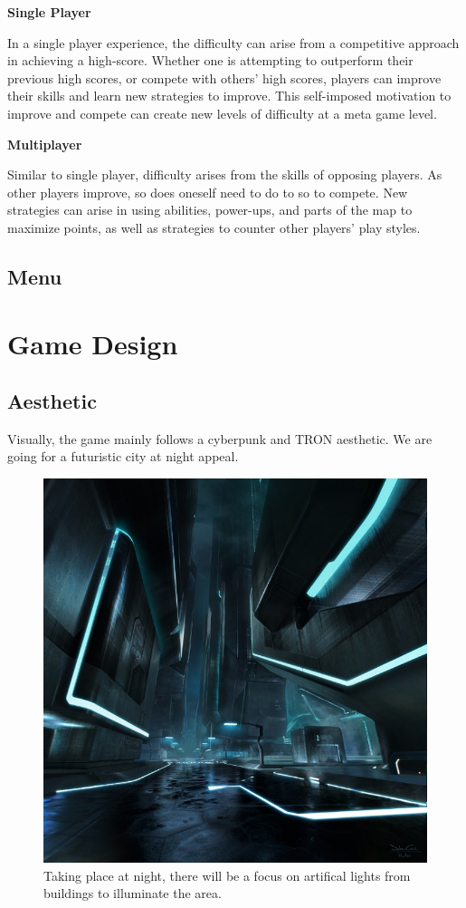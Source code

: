 \documentclass{article}
\theoremstyle{definition}
\begin{document}
\textbf{Single Player}

In a single player experience, the difficulty can arise
from a competitive approach in achieving a high-score. Whether one is
attempting to outperform their previous high scores, or compete with others'
high scores, players can improve their skills and learn new strategies to
improve. This self-imposed motivation to improve and compete can create new
levels of difficulty at a meta game level.

\textbf{Multiplayer}

Similar to single player, difficulty arises from the skills of opposing
players. As other players improve, so does oneself need to do to so to compete.
New strategies can arise in using abilities, power-ups, and parts of the map to
maximize points, as well as strategies to counter other players' play styles.

\subsection{Menu}

\section{Game Design}

\subsection{Aesthetic}

Visually, the game mainly follows a cyberpunk and TRON aesthetic. We are going
for a futuristic city at night appeal.

\begin{figure}[htpb]
  \centering
  \includegraphics[width=0.8\linewidth]{theme01.jpg}
  \caption{Taking place at night, there will be a focus on artifical lights from buildings to illuminate the area.}
\label{fig:theme01}
\end{figure}
\end{document}
